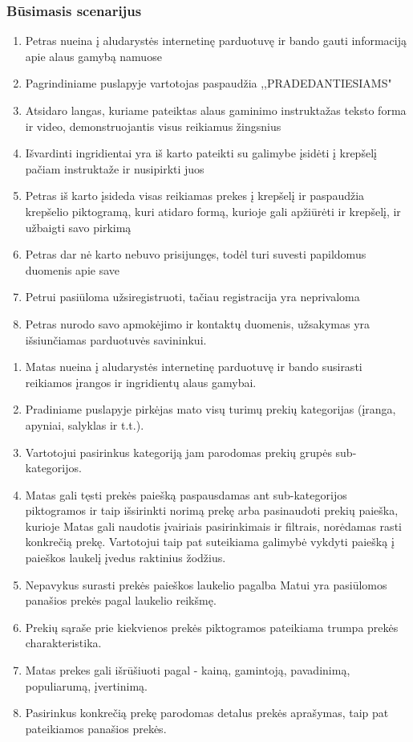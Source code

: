 \documentclass[oneside]{VUMIFPSkursinis}
\begin{document}
		\subsubsection{Būsimasis scenarijus}
				\begin{enumerate}
					\item{Petras nueina į aludarystės internetinę parduotuvę ir bando gauti informaciją apie alaus gamybą namuose}
					\item{Pagrindiniame puslapyje vartotojas paspaudžia ,,PRADEDANTIESIAMS"}
					\item{Atsidaro langas, kuriame pateiktas alaus gaminimo instruktažas teksto forma ir video, demonstruojantis visus reikiamus žingsnius}
					\item{Išvardinti ingridientai yra iš karto pateikti su galimybe įsidėti į krepšelį pačiam instruktaže ir nusipirkti juos}
					\item{Petras iš karto įsideda visas reikiamas prekes į krepšelį ir paspaudžia krepšelio piktogramą, kuri atidaro formą, kurioje gali apžiūrėti ir krepšelį, ir užbaigti savo pirkimą}
					\item{Petras dar nė karto nebuvo prisijungęs, todėl turi suvesti papildomus duomenis apie save}
					\item{Petrui pasiūloma užsiregistruoti, tačiau registracija yra neprivaloma}
					\item{Petras nurodo savo apmokėjimo ir kontaktų duomenis, užsakymas yra išsiunčiamas parduotuvės savininkui.}
				\end{enumerate}
				\begin{enumerate}
					\item{Matas nueina į aludarystės internetinę parduotuvę ir bando susirasti reikiamos įrangos ir ingridientų alaus gamybai.}
					\item{Pradiniame puslapyje pirkėjas mato visų turimų prekių kategorijas (įranga, apyniai, salyklas ir t.t.).}
					\item{Vartotojui pasirinkus kategoriją jam parodomas prekių grupės sub-kategorijos.}
					\item{Matas gali tęsti prekės paiešką paspausdamas ant sub-kategorijos piktogramos ir taip išsirinkti norimą prekę arba pasinaudoti prekių paieška, kurioje Matas gali naudotis įvairiais  pasirinkimais ir filtrais, norėdamas rasti konkrečią prekę. Vartotojui taip pat suteikiama galimybė vykdyti paiešką į paieškos laukelį įvedus raktinius žodžius.}
					\item{Nepavykus surasti prekės paieškos laukelio pagalba Matui yra pasiūlomos panašios prekės pagal laukelio reikšmę.}
					\item{Prekių sąraše prie kiekvienos prekės piktogramos pateikiama trumpa prekės charakteristika. }
					\item{Matas prekes gali išrūšiuoti pagal - kainą, gamintoją, pavadinimą, populiarumą, įvertinimą.}
					\item{Pasirinkus konkrečią prekę parodomas detalus prekės aprašymas, taip pat pateikiamos panašios prekės.}
				\end{enumerate}
\end{document}
